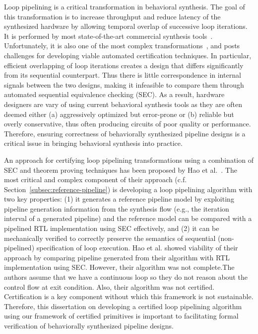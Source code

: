 Loop pipelining is a critical transformation in behavioral
synthesis. The goal of this transformation is to increase
throughput and reduce latency of the synthesized hardware by
allowing temporal overlap of successive loop iterations. It
is performed by most state-of-the-art commercial 
synthesis tools~\cite{forte,vivado,legup}.
Unfortunately, it is also one of the most complex 
transformations~\cite{tl:software-popl10},
and posts challenges for developing viable automated certification
techniques. In particular, efficient overlapping of loop
iterations creates a design that differs significantly from
its sequential counterpart. Thus there is little
correspondence in internal signals between the two designs,
making it infeasible to compare them through automated
sequential equivalence checking (SEC).
As a result, hardware designers are vary of using current behavioral synthesis tools as
they are often deemed either (a) aggressively optimized but error-prone or (b) reliable but overly conservative, thus often producing circuits of poor quality
or performance. Therefore, ensuring
correctness of behaviorally synthesized pipeline designs
is a critical issue in bringing behavioral synthesis into practice.

An approach for certifying loop pipelining transformations using a combination of SEC and theorem proving techniques has been proposed by Hao et al.~\cite{hrx:dac-12}. The most critical and complex
component of their approach (c.f. Section~\ref{subsec:reference-pipeline}) is developing
a loop pipelining algorithm with two key properties: (1) it generates a reference pipeline model by exploiting pipeline generation information from the synthesis flow (e.g., the iteration interval of a generated pipeline) and the reference model can be compared with a pipelined RTL implementation using SEC effectively, and (2) it can be mechanically verified to correctly preserve the semantics of
sequential (non-pipelined) specification of loop execution. Hao et al. showed viability of their approach by comparing pipeline generated from their algorithm with RTL implementation using SEC. However, their algorithm was not complete.The authors assume that we have a continuous loop so they do not reason about the control flow at exit condition. Also, their algorithm was not certified. Certification is a key component without which this framework is not sustainable. Therefore, this dissertation on developing a certified loop pipelining algorithm using our framework of certified primitives is important to facilitating formal verification of behaviorally synthesized pipeline designs.


